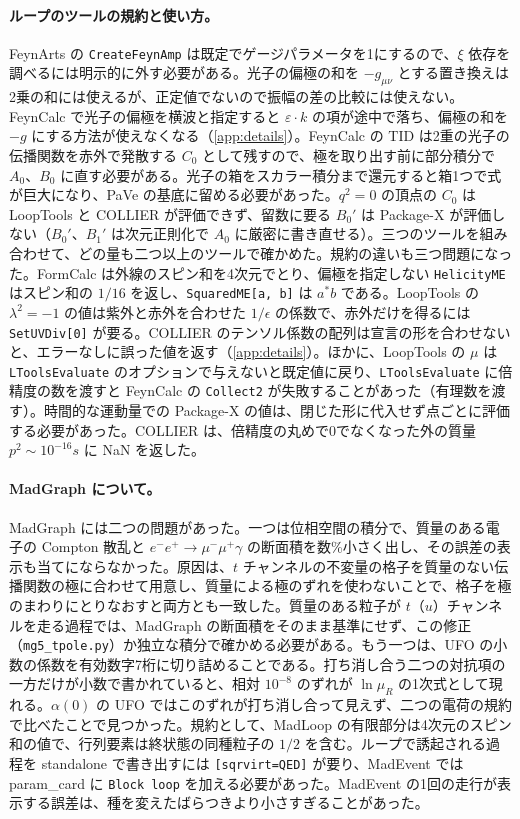 \documentclass[a4paper,10pt]{ltjsarticle}
\begin{document}
\paragraph{ループのツールの規約と使い方。}FeynArts の \texttt{CreateFeynAmp} は既定でゲージパラメータを1にするので、$\xi$ 依存を調べるには明示的に外す必要がある。光子の偏極の和を $-g_{\mu\nu}$ とする置き換えは2乗の和には使えるが、正定値でないので振幅の差の比較には使えない。FeynCalc で光子の偏極を横波と指定すると $\varepsilon\cdot k$ の項が途中で落ち、偏極の和を $-g$ にする方法が使えなくなる（\ref{app:details}）。FeynCalc の TID は2重の光子の伝播関数を赤外で発散する $C_0$ として残すので、極を取り出す前に部分積分で $A_0$、$B_0$ に直す必要がある。光子の箱をスカラー積分まで還元すると箱1つで式が巨大になり、PaVe の基底に留める必要があった。$q^2=0$ の頂点の $C_0$ は LoopTools と COLLIER が評価できず、留数に要る $B_0'$ は Package-X が評価しない（$B_0'$、$B_1'$ は次元正則化で $A_0$ に厳密に書き直せる）。三つのツールを組み合わせて、どの量も二つ以上のツールで確かめた。規約の違いも三つ問題になった。FormCalc は外線のスピン和を4次元でとり、偏極を指定しない \texttt{HelicityME} はスピン和の $1/16$ を返し、\texttt{SquaredME[a, b]} は $a^*b$ である。LoopTools の $\lambda^2=-1$ の値は紫外と赤外を合わせた $1/\epsilon$ の係数で、赤外だけを得るには \texttt{SetUVDiv[0]} が要る。COLLIER のテンソル係数の配列は宣言の形を合わせないと、エラーなしに誤った値を返す（\ref{app:details}）。ほかに、LoopTools の $\mu$ は \texttt{LToolsEvaluate} のオプションで与えないと既定値に戻り、\texttt{LToolsEvaluate} に倍精度の数を渡すと FeynCalc の \texttt{Collect2} が失敗することがあった（有理数を渡す）。時間的な運動量での Package-X の値は、閉じた形に代入せず点ごとに評価する必要があった。COLLIER は、倍精度の丸めで0でなくなった外の質量 $p^2\sim10^{-16}s$ に NaN を返した。

\paragraph{MadGraph について。}MadGraph には二つの問題があった。一つは位相空間の積分で、質量のある電子の Compton 散乱と $e^-e^+\to\mu^-\mu^+\gamma$ の断面積を数\%小さく出し、その誤差の表示も当てにならなかった。原因は、$t$ チャンネルの不変量の格子を質量のない伝播関数の極に合わせて用意し、質量による極のずれを使わないことで、格子を極のまわりにとりなおすと両方とも一致した。質量のある粒子が $t$（$u$）チャンネルを走る過程では、MadGraph の断面積をそのまま基準にせず、この修正（\texttt{mg5\_tpole.py}）か独立な積分で確かめる必要がある。もう一つは、UFO の小数の係数を有効数字7桁に切り詰めることである。打ち消し合う二つの対抗項の一方だけが小数で書かれていると、相対 $10^{-8}$ のずれが $\ln\mu_R$ の1次式として現れる。$\alpha(0)$ の UFO ではこのずれが打ち消し合って見えず、二つの電荷の規約で比べたことで見つかった。規約として、MadLoop の有限部分は4次元のスピン和の値で、行列要素は終状態の同種粒子の $1/2$ を含む。ループで誘起される過程を standalone で書き出すには \texttt{[sqrvirt=QED]} が要り、MadEvent では param\_card に \texttt{Block loop} を加える必要があった。MadEvent の1回の走行が表示する誤差は、種を変えたばらつきより小さすぎることがあった。
\end{document}
